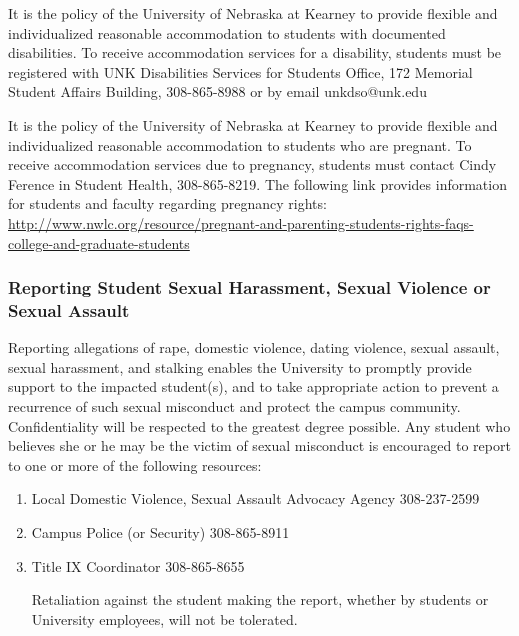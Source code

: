\documentclass[12pt,fullpage]{article}
\newcounter{ex}\setcounter{ex}{0}
\begin{document}
It is the policy of the University of Nebraska at Kearney to provide flexible and individualized reasonable accommodation to students with documented disabilities. To receive accommodation services for a disability, students must be registered with UNK Disabilities Services for Students Office, 172 Memorial Student Affairs Building, 308-865-8988 or by email unkdso@unk.edu


It is the policy of the University of Nebraska at Kearney to provide flexible and individualized reasonable accommodation to students who are pregnant. To receive accommodation services due to pregnancy, students must contact Cindy Ference in Student Health, 308-865-8219. The following link provides information for students and faculty regarding pregnancy rights:  \small \url{ http://www.nwlc.org/resource/pregnant-and-parenting-students-rights-faqs-college-and-graduate-students} \normalsize 

\subsubsection*{Reporting Student Sexual Harassment, Sexual Violence or Sexual Assault}


Reporting allegations of rape, domestic violence, dating violence, sexual assault, sexual harassment, and stalking enables the University to promptly provide support to the impacted student(s), and to take appropriate action to prevent a recurrence of such sexual misconduct and protect the campus community. Confidentiality will be respected to the greatest degree possible. Any student who believes she or he may be the victim of sexual misconduct is encouraged to report to one or more of the following resources:

\begin{enumerate}

\item Local Domestic Violence, Sexual Assault Advocacy Agency 308-237-2599

\item Campus Police (or Security) 308-865-8911

\item Title IX Coordinator 308-865-8655

Retaliation against the student making the report, whether by students or University employees, will not be tolerated.

\end{enumerate}
\end{document}
